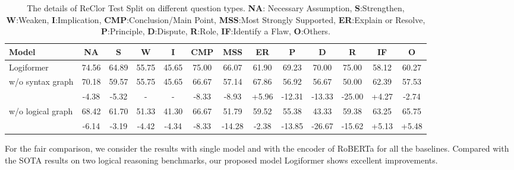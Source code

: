 \documentclass[sigconf]{acmart}
\begin{document}
\begin{table*}[t]
	\centering
	\caption{The details of ReClor Test Split on different question types. \textbf{NA}: Necessary Assumption, \textbf{S}:Strengthen, \textbf{W}:Weaken, \textbf{I}:Implication, \textbf{CMP}:Conclusion/Main Point, \textbf{MSS}:Most Strongly Supported, \textbf{ER}:Explain or Resolve, \textbf{P}:Principle, \textbf{D}:Dispute, \textbf{R}:Role, \textbf{IF}:Identify a Flaw, \textbf{O}:Others.}
	\vspace{-0.1cm}
	\begin{tabular}{p{3.2cm}|cccccccccccc}
		\toprule
		\textbf{Model} &\textbf{NA} &\textbf{S} &\textbf{W}  &\textbf{I} &\textbf{CMP} &\textbf{MSS} &\textbf{ER} &\textbf{P} &\textbf{D} &\textbf{R} &\textbf{IF} &\textbf{O}\\
		\hline
		Logiformer &74.56 &64.89 &55.75 &45.65 &75.00 &66.07 &61.90 &69.23 &70.00 &75.00 &58.12 &60.27 \\
		\hline
		\quad\quad w/o syntax graph &70.18 &59.57 &55.75 &45.65 &66.67 &57.14 &67.86 &56.92 &56.67 &50.00 &62.39 &57.53 \\
		\quad\quad\quad\quad\quad  & \cellcolor{red!15}-4.38 &\cellcolor{red!15}-5.32 &- &- &\cellcolor{red!15}-8.33 &\cellcolor{red!15}-8.93 &\cellcolor{green!15}+5.96 &\cellcolor{red!15}-12.31 &\cellcolor{red!15}-13.33 &\cellcolor{red!15}-25.00 &\cellcolor{green!15}+4.27 &\cellcolor{red!15}-2.74\\
		\hline
		\quad\quad w/o logical graph &68.42 &61.70 &51.33 &41.30 &66.67 &51.79 &59.52 &55.38 &43.33 &59.38 &63.25 &65.75 \\
		\quad\quad\quad\quad\quad  &\cellcolor{red!15}-6.14 &\cellcolor{red!15}-3.19 &\cellcolor{red!15}-4.42 &\cellcolor{red!15}-4.34 &\cellcolor{red!15}-8.33 &\cellcolor{red!15}-14.28 &\cellcolor{red!15}-2.38 &\cellcolor{red!15}-13.85 &\cellcolor{red!15}-26.67 &\cellcolor{red!15}-15.62 &\cellcolor{green!15}+5.13 &\cellcolor{green!15}+5.48 \\
		\bottomrule
	\end{tabular}
	\label{RECLOR_test}
	\vspace{-0.3cm}
\end{table*}

For the fair comparison, we consider the results with single model and with the encoder of RoBERTa for all the baselines. Compared with the SOTA results on two logical reasoning benchmarks, our proposed model Logiformer shows excellent improvements.
\end{document}
